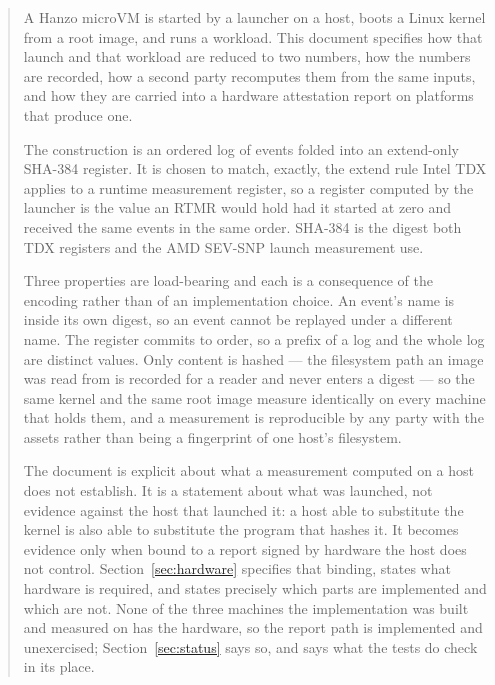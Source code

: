 \documentclass[11pt,a4paper]{article}
\begin{document}
\begin{abstract}
\noindent
A Hanzo microVM is started by a launcher on a host, boots a Linux kernel from a
root image, and runs a workload. This document specifies how that launch and
that workload are reduced to two numbers, how the numbers are recorded, how a
second party recomputes them from the same inputs, and how they are carried into
a hardware attestation report on platforms that produce one.

The construction is an ordered log of events folded into an extend-only SHA-384
register. It is chosen to match, exactly, the extend rule Intel TDX applies to a
runtime measurement register, so a register computed by the launcher is the value
an RTMR would hold had it started at zero and received the same events in the same
order. SHA-384 is the digest both TDX registers and the AMD SEV-SNP launch
measurement use.

Three properties are load-bearing and each is a consequence of the encoding rather
than of an implementation choice. An event's name is inside its own digest, so an
event cannot be replayed under a different name. The register commits to order, so
a prefix of a log and the whole log are distinct values. Only content is hashed ---
the filesystem path an image was read from is recorded for a reader and never
enters a digest --- so the same kernel and the same root image measure identically
on every machine that holds them, and a measurement is reproducible by any party
with the assets rather than being a fingerprint of one host's filesystem.

The document is explicit about what a measurement computed on a host does not
establish. It is a statement about what was launched, not evidence against the
host that launched it: a host able to substitute the kernel is also able to
substitute the program that hashes it. It becomes evidence only when bound to a
report signed by hardware the host does not control. Section~\ref{sec:hardware}
specifies that binding, states what hardware is required, and states precisely
which parts are implemented and which are not. None of the three machines the
implementation was built and measured on has the hardware, so the report path is
implemented and unexercised; Section~\ref{sec:status} says so, and says what the
tests do check in its place.
\end{abstract}

\tableofcontents

\end{document}
